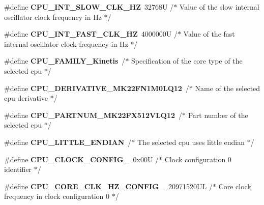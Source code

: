 \begin{DoxyCompactItemize}
\item 
\hypertarget{group___cpu__module_ga925e4835a9fdb52f03bd354d62d6ba0a}{}\#define {\bfseries C\+P\+U\+\_\+\+I\+N\+T\+\_\+\+S\+L\+O\+W\+\_\+\+C\+L\+K\+\_\+\+H\+Z}~32768\+U /$\ast$ Value of the slow internal oscillator clock frequency in Hz  $\ast$/\label{group___cpu__module_ga925e4835a9fdb52f03bd354d62d6ba0a}

\item 
\hypertarget{group___cpu__module_ga741ad9275688de8051f4bebd98a682bc}{}\#define {\bfseries C\+P\+U\+\_\+\+I\+N\+T\+\_\+\+F\+A\+S\+T\+\_\+\+C\+L\+K\+\_\+\+H\+Z}~4000000\+U /$\ast$ Value of the fast internal oscillator clock frequency in Hz  $\ast$/\label{group___cpu__module_ga741ad9275688de8051f4bebd98a682bc}

\item 
\hypertarget{group___cpu__module_ga5bf3022570d9bb7a0d666f2dd9db6a34}{}\#define {\bfseries C\+P\+U\+\_\+\+F\+A\+M\+I\+L\+Y\+\_\+\+Kinetis}~/$\ast$ Specification of the core type of the selected cpu $\ast$/\label{group___cpu__module_ga5bf3022570d9bb7a0d666f2dd9db6a34}

\item 
\hypertarget{group___cpu__module_ga81cbdf3723e599aa11b1d3d02e5f3ec6}{}\#define {\bfseries C\+P\+U\+\_\+\+D\+E\+R\+I\+V\+A\+T\+I\+V\+E\+\_\+\+M\+K22\+F\+N1\+M0\+L\+Q12}~/$\ast$ Name of the selected cpu derivative $\ast$/\label{group___cpu__module_ga81cbdf3723e599aa11b1d3d02e5f3ec6}

\item 
\hypertarget{group___cpu__module_ga3cda317080118bbfececcc29b40ad622}{}\#define {\bfseries C\+P\+U\+\_\+\+P\+A\+R\+T\+N\+U\+M\+\_\+\+M\+K22\+F\+X512\+V\+L\+Q12}~/$\ast$ Part number of the selected cpu $\ast$/\label{group___cpu__module_ga3cda317080118bbfececcc29b40ad622}

\item 
\hypertarget{group___cpu__module_gab62ca27d0a6a531f35842a6e3a94b454}{}\#define {\bfseries C\+P\+U\+\_\+\+L\+I\+T\+T\+L\+E\+\_\+\+E\+N\+D\+I\+A\+N}~/$\ast$ The selected cpu uses little endian $\ast$/\label{group___cpu__module_gab62ca27d0a6a531f35842a6e3a94b454}

\item 
\hypertarget{group___cpu__module_ga4d7ade6a1c335a7e5233938aa9197157}{}\#define {\bfseries C\+P\+U\+\_\+\+C\+L\+O\+C\+K\+\_\+\+C\+O\+N\+F\+I\+G\+\_}~0x00\+U /$\ast$ Clock configuration 0 identifier $\ast$/\label{group___cpu__module_ga4d7ade6a1c335a7e5233938aa9197157}

\item 
\hypertarget{group___cpu__module_ga6fe0b841d40421ee48af4a4e01e48ddf}{}\#define {\bfseries C\+P\+U\+\_\+\+C\+O\+R\+E\+\_\+\+C\+L\+K\+\_\+\+H\+Z\+\_\+\+C\+O\+N\+F\+I\+G\+\_}~20971520\+U\+L /$\ast$ Core clock frequency in clock configuration 0 $\ast$/\label{group___cpu__module_ga6fe0b841d40421ee48af4a4e01e48ddf}


\end{DoxyCompactItemize}

